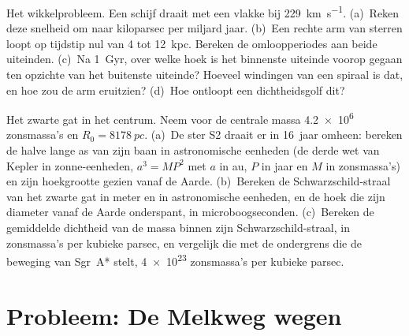 \begin{exercise}[$\star\star\star$]\label{exo:b3:milky-way-galaxies:11}
Het wikkelprobleem. Een schijf draait met een vlakke  bij
\qty{229}{km.s^{-1}}. (a)~Reken deze snelheid om naar kiloparsec per miljard
jaar. (b)~Een rechte arm van sterren loopt op tijdstip nul van 4 tot
\qty{12}{kpc}. Bereken de omloopperiodes aan beide uiteinden. (c)~Na
\qty{1}{Gyr}, over welke hoek is het binnenste uiteinde voorop gegaan ten opzichte van het buitenste
uiteinde? Hoeveel windingen van een spiraal is dat, en hoe zou de arm
eruitzien? (d)~Hoe ontloopt een dichtheidsgolf dit?
\end{exercise}

\begin{exercise}[$\star\star\star$]\label{exo:b3:milky-way-galaxies:12}
Het zwarte gat in het centrum. Neem voor de centrale massa
\num{4.2e6} zonsmassa's en $R_0 = \qty{8178}{pc}$. (a)~De ster S2
draait er in \num{16}~jaar omheen: bereken de halve lange as van zijn baan
in astronomische eenheden (de derde wet van Kepler in zonne-eenheden, $a^3 = MP^2$ met
$a$ in au, $P$ in jaar en $M$ in zonsmassa's) en zijn hoekgrootte gezien
vanaf de Aarde. (b)~Bereken de Schwarzschild-straal van het zwarte gat in meter
en in astronomische eenheden, en de hoek die zijn diameter vanaf de Aarde
onderspant, in microboogseconden. (c)~Bereken de gemiddelde dichtheid van de massa
binnen zijn Schwarzschild-straal, in zonsmassa's per kubieke parsec, en
vergelijk die met de ondergrens die de beweging van Sgr~A* stelt,
\num{4e23} zonsmassa's per kubieke parsec.
\end{exercise}

\section{Probleem: De Melkweg wegen}

